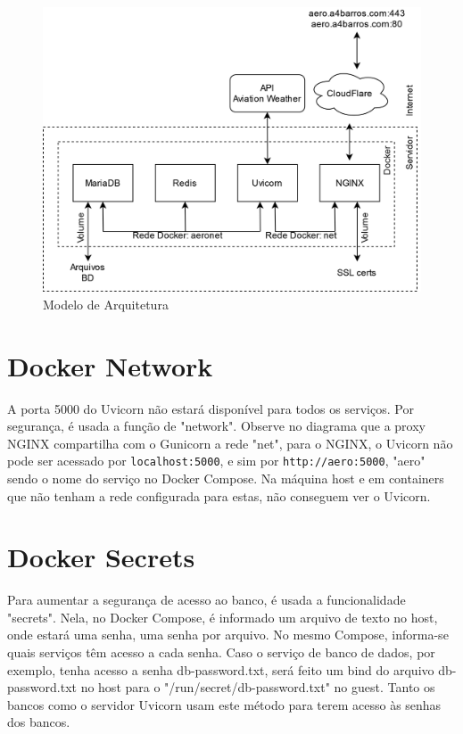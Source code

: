 \begin{figure}[ht]
    \begin{center}
    \includegraphics[width=\linewidth]{img/arquitetura.png}
    \caption{Modelo de Arquitetura}
    \label{fig:arquitetura}
    \end{center}
\end{figure}

\section{Docker Network}
A porta 5000 do Uvicorn não estará disponível para todos os serviços. Por segurança, é usada a função de
"network". Observe no diagrama que a proxy NGINX compartilha com o Gunicorn a rede "net", para o NGINX,
o Uvicorn não pode ser acessado por \texttt{localhost:5000}, e sim por \texttt{http://aero:5000}, "aero"
sendo o nome do serviço no Docker Compose. Na máquina host e em containers que não tenham a rede
configurada para estas, não conseguem ver o Uvicorn.


\section{Docker Secrets}

Para aumentar a segurança de acesso ao banco, é usada a funcionalidade "secrets". Nela, no Docker Compose,
é informado um arquivo de texto no host, onde estará uma senha, uma senha por arquivo. No mesmo Compose,
informa-se quais serviços têm acesso a cada senha. Caso o serviço de banco de dados, por exemplo, tenha
acesso a senha db-password.txt, será feito um bind do arquivo db-password.txt no host para o "/run/secret/db-password.txt"
no guest.
Tanto os bancos como o servidor Uvicorn usam este método para terem acesso às senhas dos bancos.

